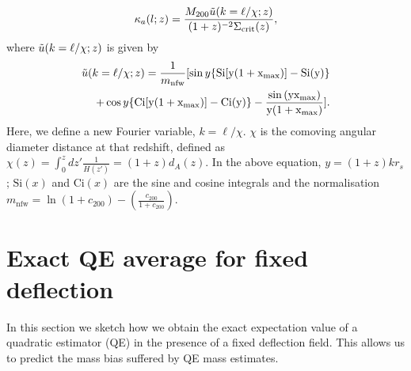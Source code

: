 \documentclass[prd, superscriptaddress, tightenlines, longbibliography, nofootinbib, eqsecnum, amsfonts, amsmath, floatfix, twocolumn, notitlepage]{revtex4-2}
\newcommand{\bs}[1]{\boldsymbol{#1}}
\begin{document}
\begin{equation}\label{eq:ft_anal1}
    \kappa_{a}(l;z) = \frac{M_{200}\Tilde{u}(k=\ell/\chi;z)}{(1+z)^{-2}\Sigma_{\text{crit}}(z)},
\end{equation}
where $\Tilde{u}(k=\ell/\chi;z)$ is given by
\begin{align}\label{eq:ft_anal2}
    \Tilde{u}(k=\ell/\chi;z) = \frac{1}{m_{\text{nfw}}}[\sin{y}\{\text{Si}[y(1+x_{\text{max}})] -\text{Si}(y)\} \nonumber \\ 
    +\cos{y}\{ \text{Ci}[y(1+x_{\text{max}})]-\text{Ci}(y) \} - \frac{\sin{(y x_{\text{max}})}}{y(1+x_{\text{max}})}].
\end{align}
Here, we define a new Fourier variable, $k =\ell/\chi$. $\chi$ is the comoving angular diameter distance at that redshift, defined as $\chi(z) = \int_0^z dz'\frac{1}{H(z')} = (1+z)d_A(z)$. In the above equation, $y = (1+z)kr_s$; $\text{Si}(x)$ and $\text{Ci}(x)$ are the sine and cosine integrals and the normalisation $m_{\text{nfw}} = \ln{(1+c_{200})}-\left(\frac{c_{200}}{1+c_{200}}\right)$.




\section{Exact QE average for fixed deflection}\label{A1}
\newcommand{\hn}[0]{\hat n}
In this section we sketch how we obtain the exact expectation value of a quadratic estimator (QE) in the presence of a fixed deflection field. This allows us to predict the mass bias suffered by QE mass estimates.
\end{document}
